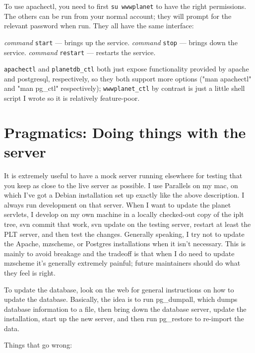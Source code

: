 \documentclass{article}
\begin{document}
To use apachectl, you need to first \texttt{su wwwplanet} to have the right
permissions. The others can be run from your normal account; they will
prompt for the relevant password when run. They all have the same
interface:

\textit{command} \texttt{start}  --- brings up the service.
\textit{command} \texttt{stop} --- brings down the service.
\textit{command} \texttt{restart} --- restarts the service.

\texttt{apachectl} and \texttt{planetdb\_ctl} both just expose
functionality provided by apache and postgresql, respectively, so they
both support more options ("man apachectl" and "man pg\_ctl"
respectively); \texttt{wwwplanet\_ctl} by contrast is just a little shell script
I wrote so it is relatively feature-poor.

\section{Pragmatics: Doing things with the server}

It is extremely useful to have a mock server running elsewhere for
testing that you keep as close to the live server as possible. I use
Parallels on my mac, on which I've got a Debian installation set up
exactly like the above description. I always run development on that
server. When I want to update the planet servlets, I develop on my own
machine in a locally checked-out copy of the iplt tree, svn commit
that work, svn update on the testing server, restart at least the PLT
server, and then test the changes. Generally speaking, I try not to
update the Apache, mzscheme, or Postgres installations when it isn't
necessary. This is mainly to avoid breakage and the tradeoff is that
when I do need to update mzscheme it's generally extremely painful;
future maintainers should do what they feel is right.

To update the database, look on the web for general instructions on
how to update the database. Basically, the idea is to run pg\_dumpall,
which dumps database information to a file, then bring down the
database server, update the installation, start up the new server, and
then run pg\_restore to re-import the data.

Things that go wrong:
\end{document}
